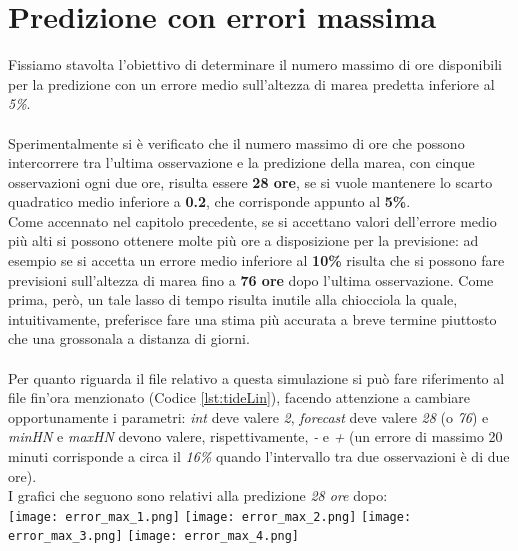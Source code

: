 	\section{Predizione con errori massima}
		Fissiamo stavolta l'obiettivo di determinare il numero massimo di ore disponibili per la predizione con un errore medio sull'altezza di marea predetta inferiore al \textit{5\%}.\\
		\\
		Sperimentalmente si è verificato che il numero massimo di ore che possono intercorrere tra l'ultima osservazione e la predizione della marea, con cinque osservazioni ogni due ore, risulta essere \textbf{28 ore}, se si vuole mantenere lo scarto quadratico medio inferiore a \textbf{0.2}, che corrisponde appunto al \textbf{5\%}.\\
		Come accennato nel capitolo precedente, se si accettano valori dell'errore medio più alti si possono ottenere molte più ore a disposizione per la previsione: ad esempio se si accetta un errore medio inferiore al \textbf{10\%} risulta che si possono fare previsioni sull'altezza di marea fino a \textbf{76 ore} dopo l'ultima osservazione. Come prima, però, un tale lasso di tempo risulta inutile alla chiocciola la quale, intuitivamente, preferisce fare una stima più accurata a breve termine piuttosto che una grossonala a distanza di giorni.\\
		\\
		Per quanto riguarda il file relativo a questa simulazione si può fare riferimento al file fin'ora menzionato (Codice \ref{lst:tideLin}), facendo attenzione a cambiare opportunamente i parametri: \textit{int} deve valere \textit{2}, \textit{forecast} deve valere \textit{28} (o \textit{76}) e \textit{minHN} e \textit{maxHN} devono valere, rispettivamente, \textit{-} e \textit{+} (un errore di massimo 20 minuti corrisponde a circa il \textit{16\%} quando l'intervallo tra due osservazioni è di due ore).\\
		I grafici che seguono sono relativi alla predizione \textit{28 ore} dopo:\\
		\texttt{[image: error\_max\_1.png]}
		\texttt{[image: error\_max\_2.png]}
		\texttt{[image: error\_max\_3.png]}
		\texttt{[image: error\_max\_4.png]}
		\FloatBarrier